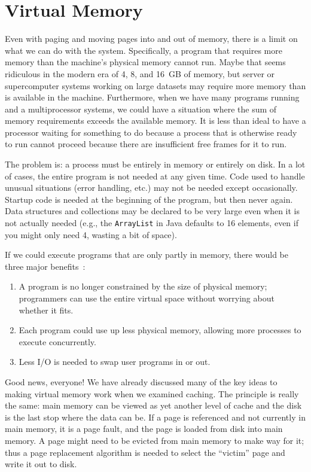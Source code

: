




\section*{Virtual Memory}
Even with paging and moving pages into and out of memory, there is a limit on what we can do with the system. Specifically, a program that requires more memory than the machine's physical memory cannot run. Maybe that seems ridiculous in the modern era of 4, 8, and 16~GB of memory, but server or supercomputer systems working on large datasets may require more memory than is available in the machine. Furthermore, when we have many programs running and a multiprocessor systems, we could have a situation where the sum of memory requirements exceeds the available memory. It is less than ideal to have a processor waiting for something to do because a process that is otherwise ready to run cannot proceed because there are insufficient free frames for it to run.

The problem is: a process must be entirely in memory or entirely on disk. In a lot of cases, the entire program is not needed at any given time. Code used to handle unusual situations (error handling, etc.) may not be needed except occasionally. Startup code is needed at the beginning of the program, but then never again. Data structures and collections may be declared to be very large even when it is not actually needed (e.g., the \texttt{ArrayList} in Java defaults to 16 elements, even if you might only need 4, wasting a bit of space).

If we could execute programs that are only partly in memory, there would be three major benefits~\cite{osc}:

\begin{enumerate}
	\item A program is no longer constrained by the size of physical memory; programmers can use the entire virtual space without worrying about whether it fits.
	\item Each program could use up less physical memory, allowing more processes to execute concurrently.
	\item Less I/O is needed to swap user programs in or out.
\end{enumerate}


Good news, everyone!  We have already discussed many of the key ideas to making virtual memory work when we examined caching. The principle is really the same: main memory can be viewed as yet another level of cache and the disk is the last stop where the data can be. If a page is referenced and not currently in main memory, it is a page fault, and the page is loaded from disk into main memory. A page might need to be evicted from main memory to make way for it; thus a page replacement algorithm is needed to select the ``victim'' page and write it out to disk. 

